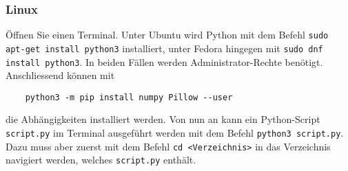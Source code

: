 \subsubsection*{Linux}
Öffnen Sie einen Terminal.
Unter Ubuntu wird Python mit dem Befehl \texttt{sudo apt-get install python3} installiert, unter Fedora hingegen mit \texttt{sudo dnf install python3}.
In beiden Fällen werden Administrator-Rechte benötigt.
Anschliessend können mit
\begin{verbatim}
	python3 -m pip install numpy Pillow --user
\end{verbatim}
die Abhängigkeiten installiert werden.
Von nun an kann ein Python-Script \texttt{script.py} im Terminal ausgeführt werden mit dem Befehl \texttt{python3 script.py}.
Dazu muss aber zuerst mit dem Befehl \texttt{cd <Verzeichnis>} in das Verzeichnis navigiert werden, welches \texttt{script.py} enthält.

